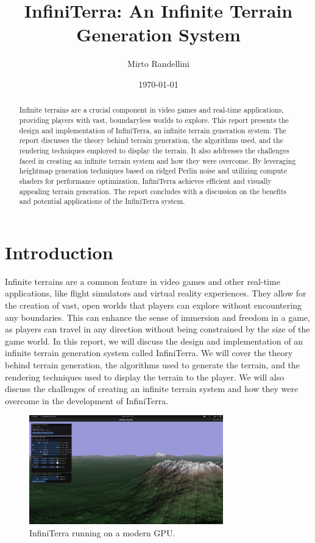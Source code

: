 \documentclass{article}
\title{InfiniTerra: An Infinite Terrain Generation System}
\author{Mirto Randellini}
\date{\today}
\begin{document}
\maketitle

\tableofcontents

\newpage

\begin{abstract}
	Infinite terrains are a crucial component in video games and real-time applications, providing
	players with vast, boundaryless worlds to explore. This report presents the design and 
	implementation of InfiniTerra, an infinite terrain generation system. The report discusses the 
	theory behind terrain generation, the algorithms used, and the rendering techniques employed to 
	display the terrain. It also addresses the challenges faced in creating an infinite terrain 
	system and how they were overcome. By leveraging heightmap generation techniques based on ridged 
	Perlin noise and utilizing compute shaders for performance optimization, InfiniTerra achieves 
	efficient and visually appealing terrain generation. The report concludes with a discussion on 
	the benefits and potential applications of the InfiniTerra system.
\end{abstract}

\section{Introduction}
\label{ch:introduction}
Infinite terrains are a common feature in video games and other real-time applications, like flight
simulators and virtual reality experiences. They allow for the creation of vast, open worlds that
players can explore without encountering any boundaries. This can enhance the sense of immersion
and freedom in a game, as players can travel in any direction without being constrained by the size
of the game world. In this report, we will discuss the design and implementation of an infinite
terrain generation system called InfiniTerra. We will cover the theory behind terrain generation,
the algorithms used to generate the terrain, and the rendering techniques used to display the
terrain to the player. We will also discuss the challenges of creating an infinite terrain system
and how they were overcome in the development of InfiniTerra.

\begin{figure}[H]
	\centering
	\includegraphics[width=0.75\textwidth]{img/infiniterra.png}
	\caption{InfiniTerra running on a modern GPU.}
	\label{fig:infiniterra}
\end{figure}
\end{document}
